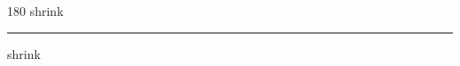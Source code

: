 
\begin{frame}
\begin{center}
\begin{turn}{180}
{\fontsize{2.5cm}{1em}\selectfont shrink}
\end{turn}
\vspace{1em}\par  
\hrule
\vspace{1em}\par  
{\fontsize{2.5cm}{1em}\selectfont shrink}
\end{center}
\end{frame}
